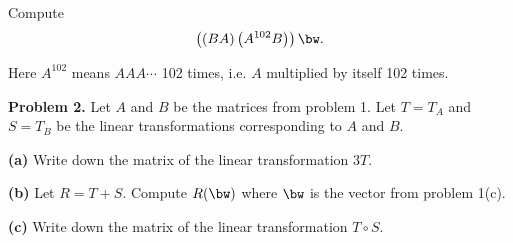 \documentclass[oneside,12pt]{amsart}
\begin{document}
Compute $$\left((BA) \left(A^{102}  B\right) \right ) \bw.$$

Here $A^{102}$ means
$A A A \cdots$ 102 times, i.e. $A$ multiplied by itself 102 times.

\bigskip
\bigskip
\bigskip
\bigskip
\bigskip
\bigskip

\textbf{Problem 2.} Let $A$ and $B$ be the matrices from problem 1.
Let $T=T_A$ and $S = T_B$ be the linear transformations corresponding to
$A$ and $B$.

\smallskip

\textbf{(a)} Write down the matrix of the linear transformation $3 T$.

\bigskip
\bigskip
\bigskip
\bigskip
\bigskip
\bigskip


\textbf{(b)} Let $R = T + S$. Compute $R(\bw)$ where $\bw$ is the vector from problem 1(c).

\bigskip
\bigskip
\bigskip
\bigskip
\bigskip
\bigskip

\textbf{(c)} Write down the matrix of the linear transformation $T \circ S$.
\end{document}
